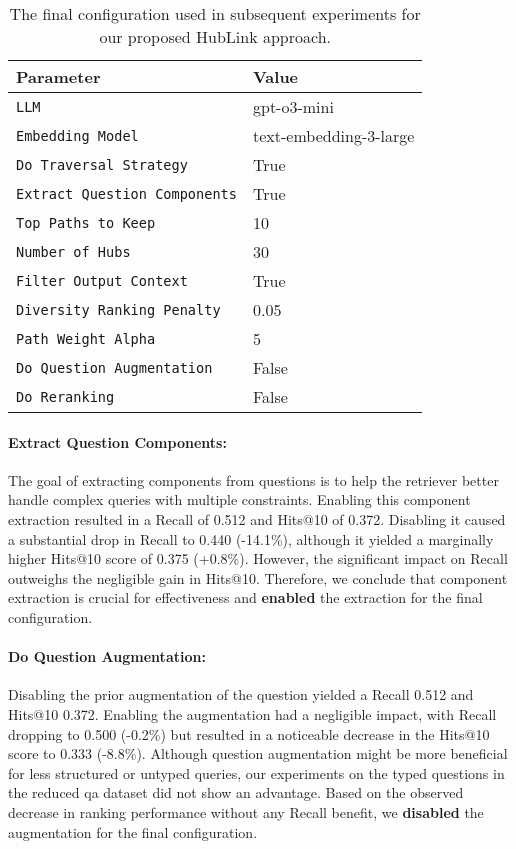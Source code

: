 \begin{table}[t]
    \centering
    \begin{tabular}{l l}   
        \toprule
        \textbf{Parameter} & \textbf{Value} \\
        \midrule
        \texttt{LLM} & gpt-o3-mini \\
        \texttt{Embedding Model} & text-embedding-3-large \\ 
        \texttt{Do Traversal Strategy} & True \\
        \texttt{Extract Question Components} & True \\
        \texttt{Top Paths to Keep} & 10 \\
        \texttt{Number of Hubs} & 30 \\
        \texttt{Filter Output Context} & True \\
        \texttt{Diversity Ranking Penalty} & 0.05 \\
        \texttt{Path Weight Alpha} & 5 \\ 
        \texttt{Do Question Augmentation} & False \\
        \texttt{Do Reranking} & False \\
        \bottomrule
    \end{tabular}
    \caption[Final Configuration for HubLink]{The final configuration used in subsequent experiments for our proposed HubLink approach.}
    \label{tab:hublink_final_config}
\end{table}

\paragraph{Extract Question Components:} 
The goal of extracting components from questions is to help the retriever better handle complex queries with multiple constraints. Enabling this component extraction resulted in a Recall of 0.512 and Hits@10 of 0.372. Disabling it caused a substantial drop in Recall to 0.440 (-14.1\%), although it yielded a marginally higher Hits@10 score of 0.375 (+0.8\%). However, the significant impact on Recall outweighs the negligible gain in Hits@10. Therefore, we conclude that component extraction is crucial for effectiveness and \textbf{enabled} the extraction for the final configuration.

\paragraph{Do Question Augmentation:} 
Disabling the prior augmentation of the question yielded a Recall 0.512 and Hits@10 0.372. Enabling the augmentation had a negligible impact, with Recall dropping to 0.500 (-0.2\%) but resulted in a noticeable decrease in the Hits@10 score to 0.333 (-8.8\%). Although question augmentation might be more beneficial for less structured or untyped queries, our experiments on the typed questions in the reduced \gls{qa} dataset did not show an advantage. Based on the observed decrease in ranking performance without any Recall benefit, we \textbf{disabled} the augmentation for the final configuration.

